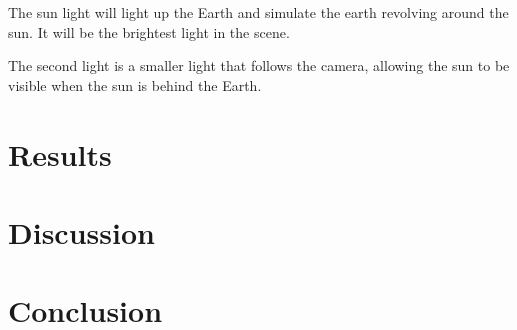 \documentclass[]{article}
\begin{document}
The sun light will light up the Earth and simulate the earth revolving around the sun.
It will be the brightest light in the scene.

The second light is a smaller light that follows the camera,
allowing the sun to be visible when the sun is behind the Earth.


\section{Results}

\section{Discussion}

\section{Conclusion}
\end{document}
